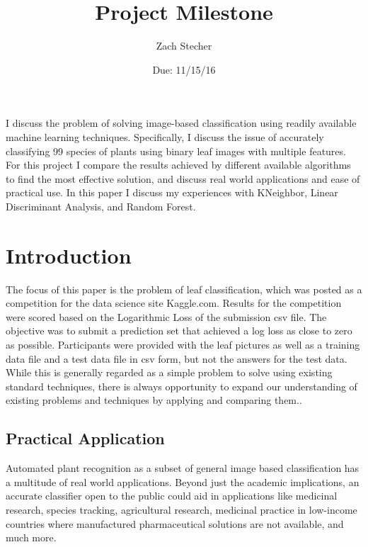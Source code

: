 \documentclass[12pt]{article}
\title{Project Milestone}
\author{Zach Stecher}
\date{Due: 11/15/16}
\begin{document}
\maketitle

\section*{}

I discuss the problem of solving image-based classification using readily available machine learning techniques. Specifically, I discuss the issue of accurately classifying 99 species of plants using binary leaf images with multiple features. For this project I compare the results achieved by different available algorithms to find the most effective solution, and discuss real world applications and ease of practical use. In this paper I discuss my experiences with KNeighbor, Linear Discriminant Analysis, and Random Forest.

\section{Introduction}

 The focus of this paper is the problem of leaf classification, which was posted as a competition for the data science site Kaggle.com. Results for the competition were scored based on the Logarithmic Loss of the submission csv file. The objective was to submit a prediction set that achieved a log loss as close to zero as possible. Participants were provided with the leaf pictures as well as a training data file and a test data file in csv form, but not the answers for the test data. While this is generally regarded as a simple problem to solve using existing standard techniques, there is always opportunity to expand our understanding of existing problems and techniques by applying and comparing them..

\subsection{Practical Application}

Automated plant recognition as a subset of general image based classification has a multitude of real world applications. Beyond just the academic implications, an accurate classifier open to the public could aid in applications like medicinal research, species tracking, agricultural research, medicinal practice in low-income countries where manufactured pharmaceutical solutions are not available, and much more.
\end{document}
